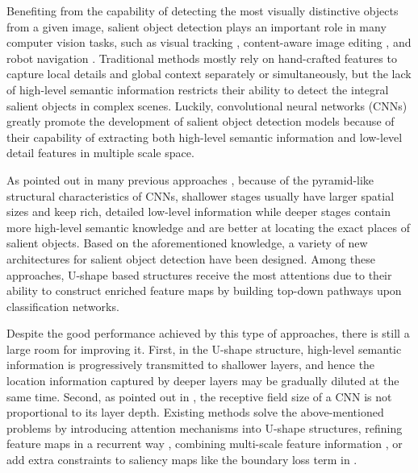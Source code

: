 \documentclass[10pt,twocolumn,letterpaper]{article}
\begin{document}
Benefiting from the capability of detecting the most visually distinctive objects from a given image,
salient object detection plays an important role in many computer vision tasks, such as
visual tracking \cite{hong2015online}, 
content-aware image editing \cite{cheng2010repfinder},
and robot navigation \cite{craye2016environment}.
Traditional methods \cite{itti1998model,liu2011learning,klein2011center,
perazzi2012saliency,borji2012exploiting,jiang2013salient,yan2013hierarchical,cheng2015global} mostly rely on hand-crafted features to
capture local details and global context separately or simultaneously, but the lack of
high-level semantic information restricts their ability to detect the integral salient objects
in complex scenes.
Luckily, convolutional neural networks (CNNs) greatly promote the development of
salient object detection models because of their capability of extracting both high-level semantic 
information and low-level detail features in multiple scale space.


As pointed out in many previous approaches \cite{hou2016deeply,luo2017non,zhang2017amulet},
because of the pyramid-like structural characteristics of CNNs, shallower stages usually have
larger spatial sizes and keep rich, detailed low-level information while deeper stages
contain more high-level semantic knowledge and are better 
at locating the exact places of salient objects.
Based on the aforementioned knowledge, a variety of new
architectures \cite{hou2016deeply,li2017instance,wang2018detect,hou2018three} for salient object detection have been designed.
Among these approaches, U-shape based structures \cite{ronneberger2015u,lin2017feature} 
receive the most attentions due to their ability to construct enriched feature maps 
by building top-down pathways upon classification networks.


Despite the good performance achieved by this type of approaches, 
there is still a large room for improving it.
First, in the U-shape structure, high-level semantic information is progressively transmitted
to shallower layers, and hence the location information captured by deeper layers may be gradually diluted
at the same time. Second, as pointed out in \cite{zhao2016pyramid}, the receptive field size of a CNN is
not proportional to its layer depth.
Existing methods solve the above-mentioned problems by introducing attention mechanisms \cite{zhang2018progressive,liu2018picanet} into U-shape structures, refining feature maps
in a recurrent way \cite{liu2016dhsnet,zhang2018progressive,wangsaliency},
combining multi-scale feature information \cite{hou2016deeply,luo2017non,zhang2017amulet,hou2018three},
or add extra constraints to saliency maps like the boundary loss term in \cite{luo2017non}.
\end{document}
